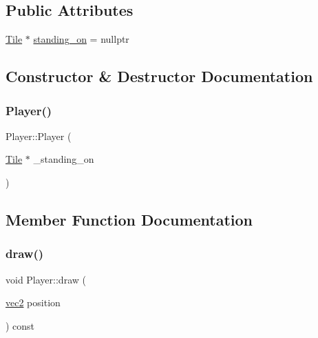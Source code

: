 \subsection*{Public Attributes}
\begin{DoxyCompactItemize}
\item 
\hyperlink{classTile}{Tile} $\ast$ \hyperlink{classPlayer_a7193ba7104612cf2ddecee5fbbe6f063}{standing\+\_\+on} = nullptr
\end{DoxyCompactItemize}


\subsection{Constructor \& Destructor Documentation}
\mbox{\label{classPlayer_a5a23c2fa4df597d3b41e068f0c54ea8a}} 
\subsubsection{\texorpdfstring{Player()}{Player()}}
{\footnotesize\ttfamily Player\+::\+Player (\begin{DoxyParamCaption}\item[{\hyperlink{classTile}{Tile} $\ast$}]{\+\_\+standing\+\_\+on }\end{DoxyParamCaption})\hspace{0.3cm}{\ttfamily [inline]}}



\subsection{Member Function Documentation}
\mbox{\label{classPlayer_adcaf37d2753307e8a7672bd32c441576}} 
\subsubsection{\texorpdfstring{draw()}{draw()}}
{\footnotesize\ttfamily void Player\+::draw (\begin{DoxyParamCaption}\item[{\hyperlink{structvec2}{vec2}}]{position }\end{DoxyParamCaption}) const\hspace{0.3cm}{\ttfamily [virtual]}}



